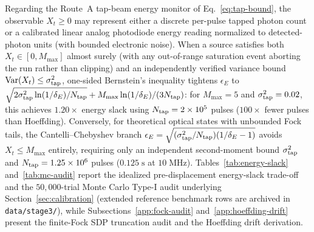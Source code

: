 \documentclass{iopjournal}
\begin{document}
Regarding the Route~A tap-beam energy monitor of Eq.~\eqref{eq:tap-bound}, the observable $X_t \ge 0$ may represent either a discrete per-pulse tapped photon count or a calibrated linear analog photodiode energy reading normalized to detected-photon units (with bounded electronic noise). When a source satisfies both $X_t \in [0, M_{\max}]$ almost surely (with any out-of-range saturation event aborting the run rather than clipping) and an independently verified variance bound $\operatorname{Var}(X_t) \le \sigma_{\rm tap}^2$, one-sided Bernstein's inequality tightens $\epsilon_E$ to $\sqrt{2\sigma_{\rm tap}^2 \ln(1/\delta_E)/N_{\rm tap}} + M_{\max}\ln(1/\delta_E)/(3N_{\rm tap})$: for $M_{\max} = 5$ and $\sigma_{\rm tap}^2 = 0.02$, this achieves $1.20\times$ energy slack using $N_{\rm tap} = 2\times 10^5$ pulses ($100\times$ fewer pulses than Hoeffding). Conversely, for theoretical optical states with unbounded Fock tails, the Cantelli--Chebyshev branch $\epsilon_E = \sqrt{(\sigma_{\rm tap}^2/N_{\rm tap})(1/\delta_E - 1)}$ avoids $X_t \le M_{\max}$ entirely, requiring only an independent second-moment bound $\sigma_{\rm tap}^2$ and $N_{\rm tap} = 1.25\times 10^6$ pulses ($0.125\;\mathrm{s}$ at $10\;\mathrm{MHz}$). Tables~\ref{tab:energy-slack} and~\ref{tab:mc-audit} report the idealized pre-displacement energy-slack trade-off and the $50{,}000$-trial Monte Carlo Type-I audit underlying Section~\ref{sec:calibration} (extended reference benchmark rows are archived in \texttt{data/stage3/}), while Subsections~\ref{app:fock-audit} and~\ref{app:hoeffding-drift} present the finite-Fock SDP truncation audit and the Hoeffding drift derivation.
\end{document}
